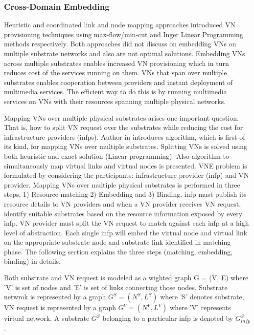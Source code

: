 \documentclass[article,dr=phil,type=msc ,colorback,accentcolor=tud4b]{tudthesis}
\begin{document}
\newpage
\subsubsection{Cross-Domain Embedding} \label{sssec:cde}
Heuristic and coordinated link and node mapping approaches introduced VN provisioning techniques using max-flow/min-cut and Inger Linear Programming methods respectively. Both approaches did not discuss on embedding VNs on multiple substrate networks and also are not optimal solutions. Embedding VNs across multiple substrates enables increased VN provisioning which in turn reduces cost of the services running on them. VNs that span over multiple substrates enables cooperation between providers and instant deployment of multimedia services. The efficient way to do this is by running multimedia services on VNs with their resources spanning multiple physical networks.\newline

Mapping VNs over multiple physical substrates arises one important question. That is, how to split VN request over the substrates while reducing the cost for infrastructure providers (infps). Author in \cite{vn_multiple} introduces algorithm, which is first of its kind, for mapping VNs over multiple substrates. Splitting VNs is solved using both heuristic and exact solution (Linear programming). Also algorithm to simultaneously map virtual links and virtual nodes is presented. VNE problem is formulated by considering the participants: infrastructure provider (infp) and VN provider. Mapping VNs over multiple physical substrates is performed in three steps, 1) Resource matching 2) Embedding and 3) Binding. infp must publish its resource details to VN providers and when a VN provider receives VN request, identify suitable substrates based on the resource information exposed by every infp. VN provider must split the VN request to match against each infp at a high level of abstraction. Each single infp will embed the virtual node and virtual link on the appropriate substrate node and substrate link identified in matching phase. The following section explains the three steps (matching, embedding, binding) in details.\newline

Both substrate and VN request is modeled as a wighted graph G = (V, E) where 'V' is set of nodes and 'E' is set of links connecting those nodes. Substrate netwrok is represented by a graph $G^{S} = (N^{S}, L^{S})$ where 'S' denotes substrate, VN request is represented by a graph $G^{V} = (N^{V}, L^{V})$ where 'V' represents virtual network. A substrate $G^{S}$ belonging to a particular infp is denoted by $G^{S}_{infp}$.\newline
\end{document}
